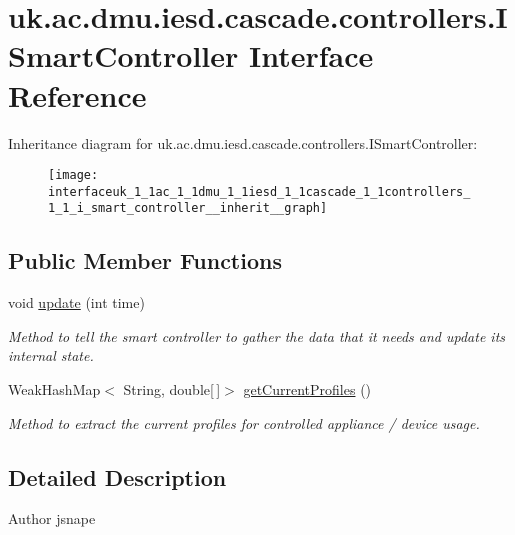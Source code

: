 \hypertarget{interfaceuk_1_1ac_1_1dmu_1_1iesd_1_1cascade_1_1controllers_1_1_i_smart_controller}{\section{uk.\-ac.\-dmu.\-iesd.\-cascade.\-controllers.\-I\-Smart\-Controller Interface Reference}
\label{interfaceuk_1_1ac_1_1dmu_1_1iesd_1_1cascade_1_1controllers_1_1_i_smart_controller}
}


Inheritance diagram for uk.\-ac.\-dmu.\-iesd.\-cascade.\-controllers.\-I\-Smart\-Controller\-:\nopagebreak
\begin{figure}[H]
\begin{center}
\leavevmode
\texttt{[image: interfaceuk\_1\_1ac\_1\_1dmu\_1\_1iesd\_1\_1cascade\_1\_1controllers\_1\_1\_i\_smart\_controller\_\_inherit\_\_graph]}
\end{center}
\end{figure}
\subsection*{Public Member Functions}
\begin{DoxyCompactItemize}
\item 
void \hyperlink{interfaceuk_1_1ac_1_1dmu_1_1iesd_1_1cascade_1_1controllers_1_1_i_smart_controller_afc5d7e6516ec865dbb4e94d62b114440}{update} (int time)
\begin{DoxyCompactList}\small\item\em Method to tell the smart controller to gather the data that it needs and update its internal state. \end{DoxyCompactList}\item 
Weak\-Hash\-Map$<$ String, double\mbox{[}$\,$\mbox{]}$>$ \hyperlink{interfaceuk_1_1ac_1_1dmu_1_1iesd_1_1cascade_1_1controllers_1_1_i_smart_controller_a8e01c21d1ff1bb37e722695a18317d18}{get\-Current\-Profiles} ()
\begin{DoxyCompactList}\small\item\em Method to extract the current profiles for controlled appliance / device usage. \end{DoxyCompactList}\end{DoxyCompactItemize}


\subsection{Detailed Description}
\begin{DoxyAuthor}{Author}
jsnape 
\end{DoxyAuthor}


